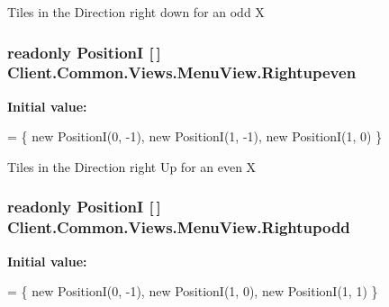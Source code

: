 Tiles in the Direction right down for an odd X 

\hypertarget{classClient_1_1Common_1_1Views_1_1MenuView_a36b0ad902b98487477a87442d088d747}{}
\subsubsection[{Rightupeven}]{\setlength{\rightskip}{0pt plus 5cm}readonly {\bf Position\+I} \mbox{[}$\,$\mbox{]} Client.\+Common.\+Views.\+Menu\+View.\+Rightupeven\hspace{0.3cm}{\ttfamily [static]}}\label{classClient_1_1Common_1_1Views_1_1MenuView_a36b0ad902b98487477a87442d088d747}
{\bfseries Initial value\+:}
\begin{DoxyCode}
=
            \{
                \textcolor{keyword}{new} PositionI(0, -1),
                \textcolor{keyword}{new} PositionI(1, -1),
                \textcolor{keyword}{new} PositionI(1, 0)
            \}
\end{DoxyCode}


Tiles in the Direction right Up for an even X 

\hypertarget{classClient_1_1Common_1_1Views_1_1MenuView_a4e6fa7548be9f1c327bb97a5447721ff}{}
\subsubsection[{Rightupodd}]{\setlength{\rightskip}{0pt plus 5cm}readonly {\bf Position\+I} \mbox{[}$\,$\mbox{]} Client.\+Common.\+Views.\+Menu\+View.\+Rightupodd\hspace{0.3cm}{\ttfamily [static]}}\label{classClient_1_1Common_1_1Views_1_1MenuView_a4e6fa7548be9f1c327bb97a5447721ff}
{\bfseries Initial value\+:}
\begin{DoxyCode}
=
            \{
                \textcolor{keyword}{new} PositionI(0, -1),
                \textcolor{keyword}{new} PositionI(1, 0),
                \textcolor{keyword}{new} PositionI(1, 1)
            \}
\end{DoxyCode}


